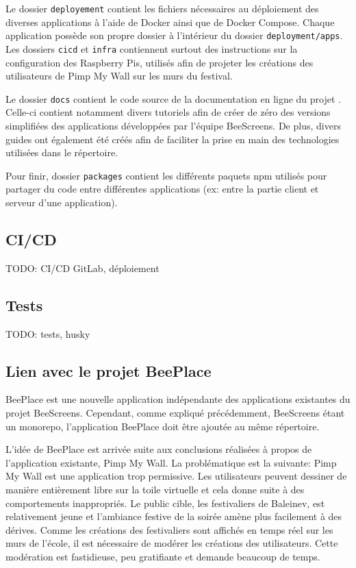 Le dossier \texttt{deployement} contient les fichiers nécessaires au déploiement des diverses applications à l'aide de Docker ainsi que de Docker Compose. Chaque application possède son propre dossier à l'intérieur du dossier \texttt{deployment/apps}. Les dossiers \texttt{cicd} et \texttt{infra} contiennent surtout des instructions sur la configuration des Raspberry Pis, utilisés afin de projeter les créations des utilisateurs de Pimp My Wall sur les murs du festival.

Le dossier \texttt{docs} contient le code source de la documentation en ligne du projet \cite{beescreensdocs}. Celle-ci contient notamment divers tutoriels afin de créer de zéro des versions simplifiées des applications développées par l'équipe BeeScreens. De plus, divers guides ont également été créés afin de faciliter la prise en main des technologies utilisées dans le répertoire.

Pour finir, dossier \texttt{packages} contient les différents paquets \Gls{npm} utilisés pour partager du code entre différentes applications (ex: entre la partie client et serveur d'une application).

\subsection{CI/CD}

TODO: CI/CD GitLab, déploiement

\subsection{Tests}

TODO: tests, husky

\subsection{Lien avec le projet BeePlace}

BeePlace est une nouvelle application indépendante des applications existantes du projet BeeScreens. Cependant, comme expliqué précédemment, BeeScreens étant un monorepo, l'application BeePlace doit être ajoutée au même répertoire.

L'idée de BeePlace est arrivée suite aux conclusions réalisées à propos de l'application existante, Pimp My Wall. La problématique est la suivante: Pimp My Wall est une application trop permissive. Les utilisateurs peuvent dessiner de manière entièrement libre sur la toile virtuelle et cela donne suite à des comportements inappropriés. Le public cible, les festivaliers de Baleinev, est relativement jeune et l'ambiance festive de la soirée amène plus facilement à des dérives. Comme les créations des festivaliers sont affichés en temps réel sur les murs de l'école, il est nécessaire de modérer les créations des utilisateurs. Cette modération est fastidieuse, peu gratifiante et demande beaucoup de temps.

